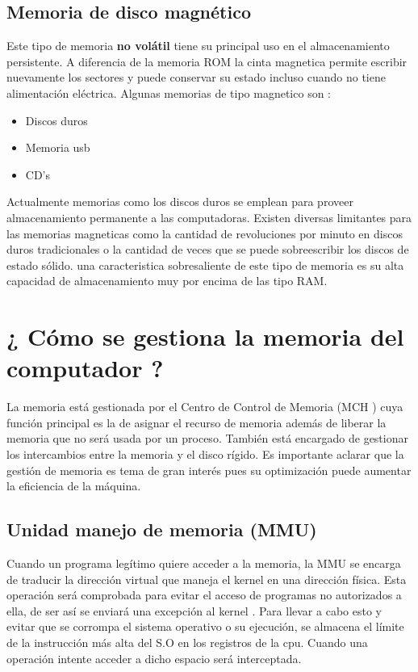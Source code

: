 \documentclass{article}
\begin{document}
\subsection{Memoria de disco magnético}
Este tipo de memoria \textbf{no volátil} tiene su principal uso en el almacenamiento persistente. A diferencia de la memoria ROM la cinta magnetica permite escribir nuevamente los sectores y puede conservar su estado incluso cuando no tiene alimentación eléctrica. Algunas memorias de tipo magnetico son :

\begin{itemize}
    \item {Discos duros }
    \item {Memoria usb}
    \item {CD's}
\end{itemize}

Actualmente memorias como los discos duros se emplean para proveer almacenamiento permanente a las computadoras. Existen diversas limitantes para las memorias magneticas como la cantidad de revoluciones por minuto en discos duros tradicionales o la cantidad de veces que se puede sobreescribir los discos de estado sólido.
una caracteristica sobresaliente de este tipo de memoria es su alta capacidad de almacenamiento muy por encima de las tipo RAM.

\section{¿ Cómo se gestiona la memoria del computador ?}

La memoria está gestionada por el Centro de Control de Memoria (MCH
) cuya función principal es la de asignar el recurso de memoria además 
de liberar la memoria que no será usada por un proceso. También está encargado de gestionar los intercambios entre la memoria y el disco rígido.
Es importante aclarar que la gestión de memoria es tema de gran interés pues su optimización puede aumentar la eficiencia de la máquina.

\subsection{Unidad manejo de memoria (MMU)}
Cuando un programa legítimo quiere acceder a la memoria, la MMU
 se encarga de traducir la dirección virtual que maneja el kernel
 en una dirección física. Esta operación será comprobada para evitar el acceso de programas no autorizados a ella, de ser así se enviará una excepción al kernel
. Para llevar a cabo esto y evitar que se corrompa el sistema operativo o su ejecución, se almacena el límite de la instrucción más alta del S.O en los registros de la cpu. Cuando una operación intente acceder a dicho espacio será interceptada.
\end{document}
